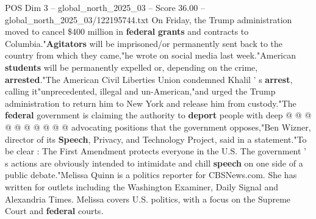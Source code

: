 \begin{textsample}{POS Dim 3 – global\_north\_2025\_03 – Score 36.00 – global\_north\_2025\_03/122195744.txt}
On Friday, the Trump administration moved to cancel \$400 million in \textbf{federal} \textbf{grants} and contracts to Columbia."\textbf{Agitators} will be imprisoned/or permanently sent back to the country from which they came,"he wrote on social media last week."American \textbf{students} will be permanently expelled or, depending on the crime, \textbf{arrested}."The American Civil Liberties Union condemned Khalil ' s \textbf{arrest}, calling it"unprecedented, illegal and un-American,"and urged the Trump administration to return him to New York and release him from custody."The \textbf{federal} government is claiming the authority to \textbf{deport} people with deep @ @ @ @ @ @ @ @ @ @ advocating positions that the government opposes,"Ben Wizner, director of its \textbf{Speech}, Privacy, and Technology Project, said in a statement."To be clear : The First Amendment protects everyone in the U.S.
The government ' s actions are obviously intended to intimidate and chill \textbf{speech} on one side of a public debate."Melissa Quinn is a politics reporter for CBSNews.com.
She has written for outlets including the Washington Examiner, Daily Signal and Alexandria Times.
Melissa covers U.S. politics, with a focus on the Supreme Court and \textbf{federal} courts.

\end{textsample}

